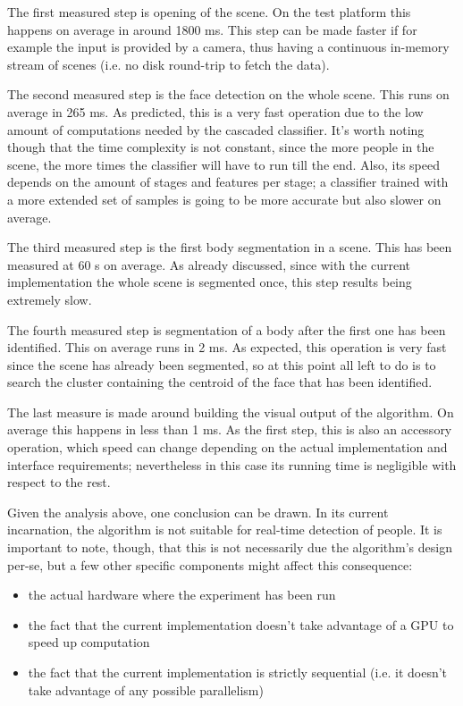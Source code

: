 \documentclass[a4paper,11pt,titlepage]{article}
\begin{document}
The first measured step is opening of the scene. On the test platform this
happens on average in around 1800 ms. This step can be made faster if for
example the input is provided by a camera, thus having a continuous in-memory
stream of scenes (i.e. no disk round-trip to fetch the data).

The second measured step is the face detection on the whole scene. This runs on
average in 265 ms. As predicted, this is a very fast operation due to the low
amount of computations needed by the cascaded classifier. It's worth noting
though that the time complexity is not constant, since the more people in the
scene, the more times the classifier will have to run till the end. Also, its
speed depends on the amount of stages and features per stage; a classifier
trained with a more extended set of samples is going to be more accurate but
also slower on average.

The third measured step is the first body segmentation in a scene. This has been
measured at 60 s on average. As already discussed, since with the current
implementation the whole scene is segmented once, this step results being
extremely slow.

The fourth measured step is segmentation of a body after the first one has been
identified. This on average runs in 2 ms. As expected, this operation is very
fast since the scene has already been segmented, so at this point all left to do
is to search the cluster containing the centroid of the face that has been
identified.

The last measure is made around building the visual output of the algorithm. On
average this happens in less than 1 ms. As the first step, this is also an
accessory operation, which speed can change depending on the actual
implementation and interface requirements; nevertheless in this case its running
time is negligible with respect to the rest.

Given the analysis above, one conclusion can be drawn. In its current
incarnation, the algorithm is not suitable for real-time detection of people.
It is important to note, though, that this is not necessarily due the
algorithm's design per-se, but a few other specific components might affect this
consequence:

\begin{itemize}
  \item the actual hardware where the experiment has been run
  \item the fact that the current implementation doesn't take advantage of a
    GPU to speed up computation
  \item the fact that the current implementation is strictly sequential (i.e. it
    doesn't take advantage of any possible parallelism)
\end{itemize}
\end{document}
